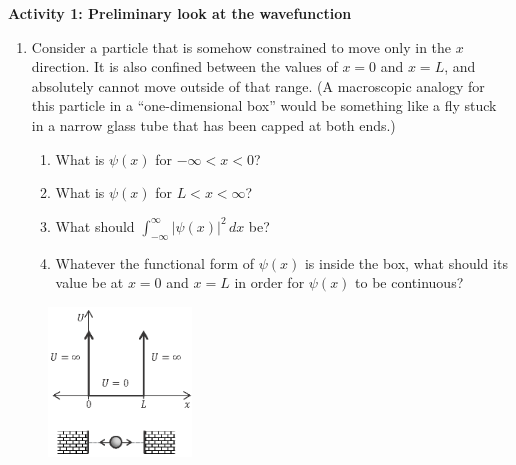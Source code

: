 \textbf{Activity 1: Preliminary look at the wavefunction}
\begin{enumerate}[wide]
\item Consider a particle that is somehow constrained to move only in the $x$ direction.  It is also confined between the values of $x=0$ and $x=L$, and absolutely cannot move outside of that range.
(A macroscopic analogy for this particle in a ``one-dimensional box'' would be something like a fly stuck in a narrow glass tube that has been capped at both ends.)
\begin{enumerate}[labparts]
\item What is $\psi(x)$ for $-\infty < x < 0$?
\answerspace{0.3in}

\item What is $\psi(x)$ for $L < x < \infty$?
\answerspace{0.3in}

\item What should $\displaystyle \int_{-\infty}^\infty \left|\psi(x)\right|^2  \, dx$ be?
\answerspace{0.3in}

\item Whatever the functional form of $\psi(x)$ is inside the box, what should its value be at $x=0$ and $x=L$ in order for 
$\psi(x)$ to be continuous?
\answerspace{0.3in}
\end{enumerate}
\end{enumerate}
\pagebreak

\begin{figure}
\begin{center}
\vspace{-0.2in}
\includegraphics[width=0.34\textwidth]{particle_in_infinite_well/infinite_potential.eps}
\end{center}
\end{figure}


